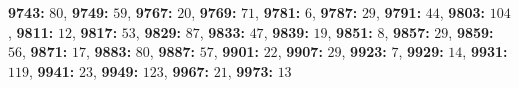 \textsf{\bfseries 9743:} $80$, \textsf{\bfseries 9749:} $59$, \textsf{\bfseries 9767:} $20$, \textsf{\bfseries 9769:} $71$, \textsf{\bfseries 9781:} $6$, \textsf{\bfseries 9787:} $29$, \textsf{\bfseries 9791:} $44$, \textsf{\bfseries 9803:} $104$, \textsf{\bfseries 9811:} $12$, \textsf{\bfseries 9817:} $53$, \textsf{\bfseries 9829:} $87$, \textsf{\bfseries 9833:} $47$, \textsf{\bfseries 9839:} $19$, \textsf{\bfseries 9851:} $8$, \textsf{\bfseries 9857:} $29$, \textsf{\bfseries 9859:} $56$, \textsf{\bfseries 9871:} $17$, \textsf{\bfseries 9883:} $80$, \textsf{\bfseries 9887:} $57$, \textsf{\bfseries 9901:} $22$, \textsf{\bfseries 9907:} $29$, \textsf{\bfseries 9923:} $7$, \textsf{\bfseries 9929:} $14$, \textsf{\bfseries 9931:} $119$, \textsf{\bfseries 9941:} $23$, \textsf{\bfseries 9949:} $123$, \textsf{\bfseries 9967:} $21$, \textsf{\bfseries 9973:} $13$